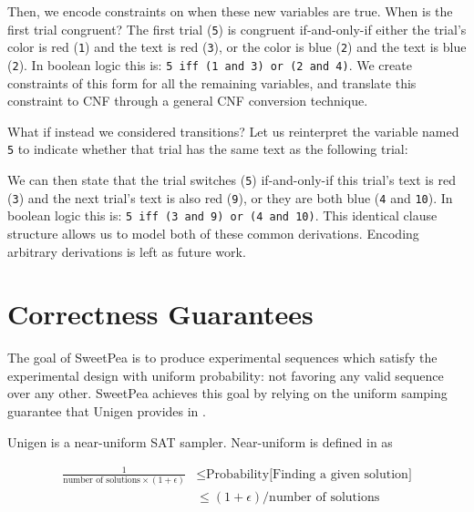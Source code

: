 Then, we encode constraints on when these new variables are true. When is the first trial congruent? The first trial (\texttt{5}) is congruent if-and-only-if either the trial's color is red (\texttt{1}) and the text is red (\texttt{3}), or the color is blue (\texttt{2}) and the text is blue (\texttt{2}). In boolean logic this is: \texttt{5 iff (1 and 3) or (2 and 4)}. We create constraints of this form for all the remaining variables, and translate this constraint to CNF through a general CNF conversion technique.

What if instead we considered transitions? Let us reinterpret the variable named \texttt{5} to indicate whether that trial has the same text as the following trial:





We can then state that the trial switches (\texttt{5}) if-and-only-if this trial's text is red (\texttt{3}) and the next trial's text is also red (\texttt{9}), or they are both blue (\texttt{4} and \texttt{10}). In boolean logic this is: \texttt{5 iff (3 and 9) or (4 and 10)}. This identical clause structure allows us to model both of these common derivations. Encoding arbitrary derivations is left as future work.

\section{Correctness Guarantees}

The goal of SweetPea is to produce experimental sequences which satisfy the experimental design with uniform probability: not favoring any valid sequence over any other. SweetPea achieves this goal by relying on the uniform samping guarantee that Unigen provides in \cite{chakraborty2013scalable}.

Unigen is a near-uniform SAT sampler. Near-uniform is defined in \cite{meel2016constrained} as

\begin{align*}
  \frac{1}{\text{number of solutions}\times(1+ \epsilon)} & \leq \text{Probability[Finding a given solution]} \\
  &\leq (1+\epsilon) / \text{number of solutions}
\end{align*}

